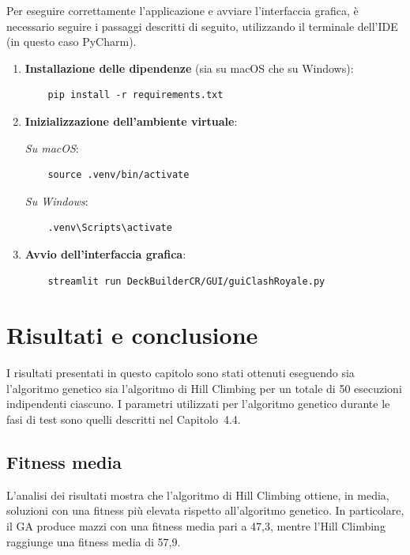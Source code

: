 \documentclass{article}
\begin{document}
Per eseguire correttamente l’applicazione e avviare l’interfaccia grafica, è necessario seguire i passaggi descritti di seguito, utilizzando il terminale dell’IDE (in questo caso PyCharm).

\begin{enumerate}
    \item \textbf{Installazione delle dipendenze} (sia su macOS che su Windows):
    \begin{verbatim}
    pip install -r requirements.txt
    \end{verbatim}

    \item \textbf{Inizializzazione dell’ambiente virtuale}:
    
    \textit{Su macOS}:
    \begin{verbatim}
    source .venv/bin/activate
    \end{verbatim}

    \textit{Su Windows}:
    \begin{verbatim}
    .venv\Scripts\activate
    \end{verbatim}

    \item \textbf{Avvio dell’interfaccia grafica}:
    \begin{verbatim}
    streamlit run DeckBuilderCR/GUI/guiClashRoyale.py
    \end{verbatim}
\end{enumerate}

\section{Risultati e conclusione}

I risultati presentati in questo capitolo sono stati ottenuti eseguendo sia l’algoritmo genetico sia l’algoritmo di Hill Climbing per un totale di 50 esecuzioni indipendenti ciascuno.  
I parametri utilizzati per l’algoritmo genetico durante le fasi di test sono quelli descritti nel Capitolo~4.4.

\subsection{Fitness media}

L’analisi dei risultati mostra che l’algoritmo di Hill Climbing ottiene, in media, soluzioni con una fitness più elevata rispetto all’algoritmo genetico.  
In particolare, il GA produce mazzi con una fitness media pari a 47{,}3, mentre l’Hill Climbing raggiunge una fitness media di 57{,}9.
\end{document}
